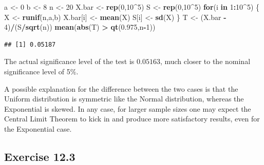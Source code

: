 \documentclass[]{krantz}
\makeatletter
\newenvironment{Shaded}{\begin{snugshade}}{\end{snugshade}}
\newcommand{\KeywordTok}[1]{\textcolor[rgb]{0.13,0.29,0.53}{\textbf{#1}}}
\newcommand{\DecValTok}[1]{\textcolor[rgb]{0.00,0.00,0.81}{#1}}
\newcommand{\FloatTok}[1]{\textcolor[rgb]{0.00,0.00,0.81}{#1}}
\newcommand{\StringTok}[1]{\textcolor[rgb]{0.31,0.60,0.02}{#1}}
\newcommand{\ControlFlowTok}[1]{\textcolor[rgb]{0.13,0.29,0.53}{\textbf{#1}}}
\newcommand{\OperatorTok}[1]{\textcolor[rgb]{0.81,0.36,0.00}{\textbf{#1}}}
\newcommand{\NormalTok}[1]{#1}
\newenvironment{kframe}{%
\medskip{}
\setlength{\fboxsep}{.8em}
 \def\at@end@of@kframe{}%
 \ifinner\ifhmode%
  \def\at@end@of@kframe{\end{minipage}}%
  \begin{minipage}{\columnwidth}%
 \fi\fi%
 \def\FrameCommand##1{\hskip\@totalleftmargin \hskip-\fboxsep
 \colorbox{shadecolor}{##1}\hskip-\fboxsep
     \hskip-\linewidth \hskip-\@totalleftmargin \hskip\columnwidth}%
 \MakeFramed {\advance\hsize-\width
   \@totalleftmargin\z@ \linewidth\hsize
   \@setminipage}}%
 {\par\unskip\endMakeFramed%
 \at@end@of@kframe}
\renewenvironment{Shaded}{\begin{kframe}}{\end{kframe}}
\theoremstyle{definition}
\theoremstyle{definition}
\theoremstyle{definition}
\theoremstyle{remark}
\makeatother
\begin{document}
\begin{enumerate}
\begin{Shaded}
\begin{Highlighting}[]
\NormalTok{a <-}\StringTok{ }\DecValTok{0}
\NormalTok{b <-}\StringTok{ }\DecValTok{8}
\NormalTok{n <-}\StringTok{ }\DecValTok{20}
\NormalTok{X.bar <-}\StringTok{ }\KeywordTok{rep}\NormalTok{(}\DecValTok{0}\NormalTok{,}\DecValTok{10}\OperatorTok{^}\DecValTok{5}\NormalTok{)}
\NormalTok{S <-}\StringTok{ }\KeywordTok{rep}\NormalTok{(}\DecValTok{0}\NormalTok{,}\DecValTok{10}\OperatorTok{^}\DecValTok{5}\NormalTok{)}
\ControlFlowTok{for}\NormalTok{(i }\ControlFlowTok{in} \DecValTok{1}\OperatorTok{:}\DecValTok{10}\OperatorTok{^}\DecValTok{5}\NormalTok{) \{}
\NormalTok{  X <-}\StringTok{ }\KeywordTok{runif}\NormalTok{(n,a,b)}
\NormalTok{  X.bar[i] <-}\StringTok{ }\KeywordTok{mean}\NormalTok{(X)}
\NormalTok{  S[i] <-}\StringTok{ }\KeywordTok{sd}\NormalTok{(X)}
\NormalTok{\}}
\NormalTok{T <-}\StringTok{ }\NormalTok{(X.bar }\OperatorTok{-}\StringTok{ }\DecValTok{4}\NormalTok{)}\OperatorTok{/}\NormalTok{(S}\OperatorTok{/}\KeywordTok{sqrt}\NormalTok{(n))}
\KeywordTok{mean}\NormalTok{(}\KeywordTok{abs}\NormalTok{(T) }\OperatorTok{>}\StringTok{ }\KeywordTok{qt}\NormalTok{(}\FloatTok{0.975}\NormalTok{,n}\OperatorTok{-}\DecValTok{1}\NormalTok{))}
\end{Highlighting}
\end{Shaded}

\begin{verbatim}
## [1] 0.05187
\end{verbatim}

  The actual significance level of the test is \(0.05163\), much closer
  to the nominal significance level of 5\%.

  A possible explanation for the difference between the two cases is
  that the Uniform distribution is symmetric like the Normal
  distribution, whereas the Exponential is skewed. In any case, for
  larger sample sizes one may expect the Central Limit Theorem to kick
  in and produce more satisfactory results, even for the Exponential
  case.
\end{enumerate}

\subsection*{Exercise 12.3}\label{exercise-12.3}
\end{document}
